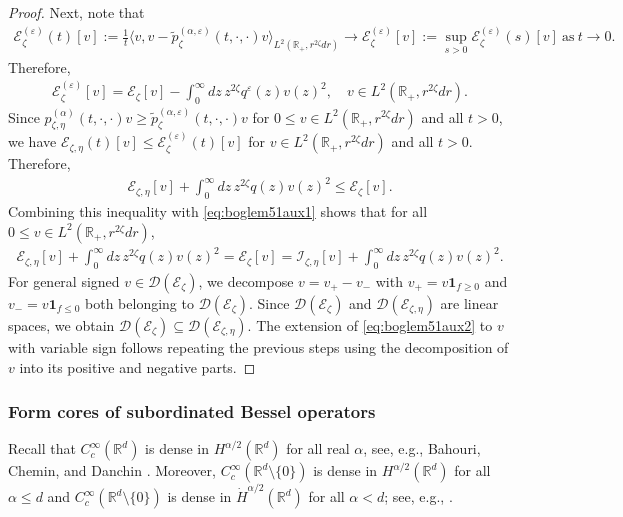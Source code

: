 \documentclass[12pt,reqno]{amsart}
\theoremstyle{definition}
\theoremstyle{remark}
\numberwithin{equation}{section}
\newcommand{\1}{\mathbbm{1}}
\newcommand{\D}{\mathcal{D}}
\renewcommand{\epsilon}{\varepsilon}
\newcommand{\R}{\mathbb{R}}
\def\ce{\mathcal{E}}
\def\ci{\mathcal{I}}
\newcommand{\one}{\mathbf{1}}
\begin{document}
\begin{proof}
  Next, note that
  \begin{align*}
    \ce_{\zeta}^{(\epsilon)}(t)[v] := \frac1t\langle v,v- \tilde p_\zeta^{(\alpha,\epsilon)}(t,\cdot,\cdot)v\rangle_{L^2(\R_+,r^{2\zeta}dr)}
    \to \ce_{\zeta}^{(\epsilon)}[v] := \sup_{s>0} \ce_{\zeta}^{(\epsilon)}(s)[v]
    \ \text{as} \ t\to0.
  \end{align*}
  Therefore,
  \begin{align}
    \ce_\zeta^{(\epsilon)}[v]
    = \ce_\zeta[v] - \int_0^\infty dz\, z^{2\zeta} q^\epsilon(z)v(z)^2,
    \quad v\in L^2(\R_+,r^{2\zeta}dr).
  \end{align}
  Since
  $p_{\zeta,\eta}^{(\alpha)}(t,\cdot,\cdot)v \geq \tilde p_\zeta^{(\alpha,\epsilon)}(t,\cdot,\cdot)v$
  for $0\leq v\in L^2(\R_+,r^{2\zeta}dr)$ and all $t>0$,
  we have
  $\ce_{\zeta,\eta}(t)[v]\leq \ce_\zeta^{(\epsilon)}(t)[v]$ for $v\in L^2(\R_+,r^{2\zeta}dr)$
  and all $t>0$. Therefore,
  \begin{align}
    \ce_{\zeta,\eta}[v] + \int_0^\infty dz\, z^{2\zeta}q(z) v(z)^2 \leq \ce_\zeta[v].
  \end{align}
  Combining this inequality with \eqref{eq:boglem51aux1} shows that for all $0\leq v\in L^2(\R_+,r^{2\zeta}dr)$,
  \begin{align}
    \label{eq:boglem51aux2}
    \ce_{\zeta,\eta}[v] + \int_0^\infty dz\, z^{2\zeta}q(z)v(z)^2
    = \ce_\zeta[v]
    = \ci_{\zeta,\eta}[v] + \int_0^\infty dz\, z^{2\zeta}q(z)v(z)^2.
  \end{align}
  For general signed $v\in\D(\ce_\zeta)$, we decompose $v=v_+-v_-$ with $v_+=v\one_{f\geq0}$ and $v_-=v\one_{f\leq0}$ both belonging to $\D(\ce_\zeta)$. Since $\D(\ce_\zeta)$ and $\D(\ce_{\zeta,\eta})$ are linear spaces, we obtain $\D(\ce_\zeta)\subseteq\D(\ce_{\zeta,\eta})$. 
  The extension of \eqref{eq:boglem51aux2} to $v$ with variable sign follows repeating the previous steps using the decomposition of $v$ into its positive and negative parts.
\end{proof}


\subsubsection{Form cores of subordinated Bessel operators}
\label{ss:besseldomainalpha}

Recall that $C_c^\infty(\R^d)$ is dense in $H^{\alpha/2}(\R^d)$ for all real $\alpha$, see, e.g., Bahouri, Chemin, and Danchin \cite[Theorems~1.61]{Bahourietal2011}. Moreover, $C_c^\infty(\R^d\setminus\{0\})$ is dense in $H^{\alpha/2}(\R^d)$ for all $\alpha\leq d$ and $C_c^\infty(\R^d\setminus\{0\})$ is dense in $\dot H^{\alpha/2}(\R^d)$ for all $\alpha<d$; see, e.g., \cite[Theorem~1.70]{Bahourietal2011}.
\end{document}
